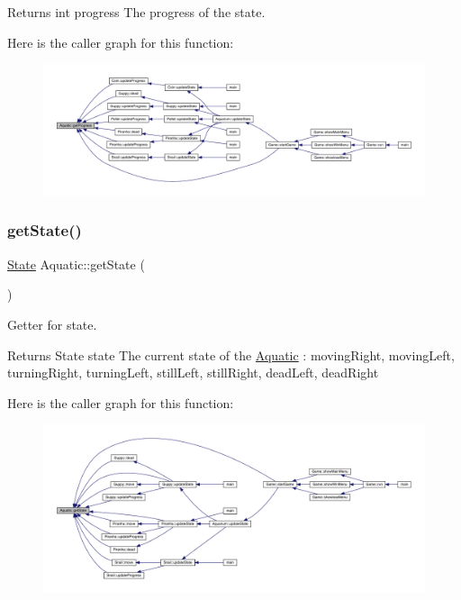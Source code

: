 \begin{DoxyReturn}{Returns}
int progress The progress of the state. 
\end{DoxyReturn}
Here is the caller graph for this function\+:
\nopagebreak
\begin{figure}[H]
\begin{center}
\leavevmode
\includegraphics[width=350pt]{class_aquatic_a0de76e489d82ccad52dec32a1978850c_icgraph}
\end{center}
\end{figure}
\mbox{\label{class_aquatic_a3d73a0494585841ebd2acaee7281ece5}} 
\subsubsection{\texorpdfstring{get\+State()}{getState()}}
{\footnotesize\ttfamily \mbox{\hyperlink{_constants_8hpp_a5d74787dedbc4e11c1ab15bf487e61f8}{State}} Aquatic\+::get\+State (\begin{DoxyParamCaption}{ }\end{DoxyParamCaption})}



Getter for state. 

\begin{DoxyReturn}{Returns}
State state The current state of the \mbox{\hyperlink{class_aquatic}{Aquatic}} \+: moving\+Right, moving\+Left, turning\+Right, turning\+Left, still\+Left, still\+Right, dead\+Left, dead\+Right 
\end{DoxyReturn}
Here is the caller graph for this function\+:
\nopagebreak
\begin{figure}[H]
\begin{center}
\leavevmode
\includegraphics[width=350pt]{class_aquatic_a3d73a0494585841ebd2acaee7281ece5_icgraph}
\end{center}
\end{figure}
\mbox{\label{class_aquatic_ab59ba97a4876a0e3ae8b85c1915a82f9}} 
